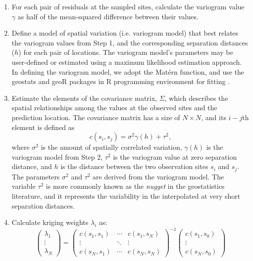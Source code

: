 \documentclass[a4paper,fleqn]{cas-sc}
\begin{document}
\begin{enumerate}

    \item For each pair of residuals at the sampled sites, calculate the variogram value $\gamma$ as half of the mean-squared difference between their values. 
    
    \item Define a model of spatial variation (i.e. variogram model) that best relates the variogram values from Step 1, and the corresponding separation distances ($h$) for each pair of locations. The variogram model's parameters may be user-defined or estimated using a maximum likelihood estimation approach. In defining the variogram model, we adopt the Mat\'ern function, and use the geostats and geoR packages in R programming environment for fitting \citep{diggle2007, georpackage2001, geostatsRpkg, rpackage2006}. 
    
    \item Estimate the elements of the covariance matrix, $\Sigma$, which describes the spatial relationships among the values at the observed sites and the prediction location. The covariance matrix has a size of $N \times N$, and its $i-j$th element is defined as 
    \begin{equation}
    c(s_{i}, s_{j}) = \sigma^{2}\gamma(h) + \tau^2,
    \end{equation} \label{eq:cov}
    where $\sigma^2$ is the amount of spatially correlated variation, $\gamma(h)$ is the variogram model from Step 2, $\tau^2$ is the variogram value at zero separation distance, and $h$ is the distance between the two observation sites $s_{i}$ and $s_{j}$. The parameters $\sigma^2$ and $\tau^2$ are derived from the variogram model. The variable $\tau^2$ is more commonly known as the \textit{nugget} in the geostatistics literature, and it represents the variability in the interpolated at very short separation distances. 
    
    \item Calculate kriging weights $\lambda_{i}$ as:
    \begin{equation}
    \begin{pmatrix}
    \lambda_{1}\\ 
    \vdots \\ 
    \lambda_{N}
    \end{pmatrix}   = 
    \begin{pmatrix}
    c(s_{1}, s_{1}) &  \cdots & c(s_{1}, s_{N})  \\ 
    \vdots & \ddots  & \vdots\\ 
    c(s_{N}, s_{1}) & \cdots  & c(s_{N}, s_{N})  
    \end{pmatrix}^{-1}
    \begin{pmatrix}
    c(s_{1}, s_{0})\\ 
    \vdots \\ 
    c(s_{N}, s_{0})
    \end{pmatrix} 
    \end{equation} \label{eq:cov}    
    

\end{enumerate}
\end{document}
